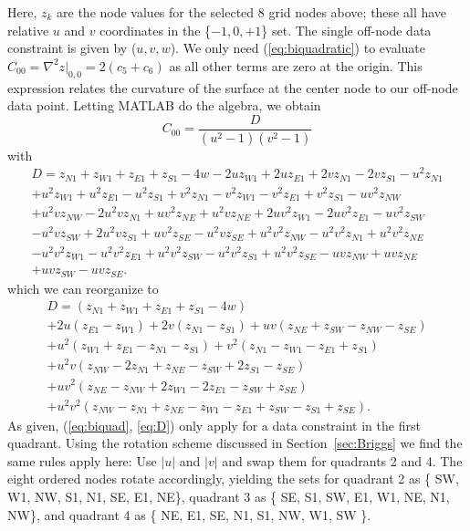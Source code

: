 \documentclass[12pt,letterpaper,margin=0.5in]{article}
\begin{document}
Here, $z_k$ are the node values for the selected 8 grid nodes above;
these all have relative $u$ and $v$ coordinates in the \{$-1, 0, +1$\} set.
The single off-node data constraint is given by ($u,v,w$).  We only need
(\ref{eq:biquadratic}) to evaluate $C_{00} = \nabla^2 z \rvert _{0, 0} = 2 \left(c_5 + c_6 \right)$
as all other terms are zero at the origin.  This expression relates the curvature of the
surface at the center node to our off-node data point.  Letting MATLAB do the algebra,
we obtain
\begin{equation}
C_{00} = \frac{D}{(u^2-1)(v^2-1)}
\label{eq:biquad}
\end{equation}
with
\begin{equation}
\begin{split}
D = z_{N1} + z_{W1} + z_{E1} + z_{S1} - 4w - 2u z_{W1} + 2 u z_{E1} + 2 v z_{N1} - 2 v z_{S1} - u^2 z_{N1}   \\
    + u^2 z_{W1} + u^2 z_{E1} - u^2 z_{S1} + v^2 z_{N1} - v^2 z_{W1} - v^2 z_{E1} + v^2 z_{S1} - u v^2 z_{NW}    \\
    + u^2 v z_{NW} - 2 u^2 v z_{N1} + u v^2 z_{NE} + u^2 v z_{NE} + 2 u v^2 z_{W1} - 2 u v^2 z_{E1} - u v^2 z_{SW}  \\
    - u^2 v z_{SW} + 2 u^2 v z_{S1} + u v^2 z_{SE} - u^2 v z_{SE} + u^2 v^2 z_{NW} - u^2 v^2 z_{N1} + u^2 v^2 z_{NE}   \\
    - u^2 v^2 z_{W1} - u^2 v^2 z_{E1}+ u^2 v^2 z_{SW} - u^2 v^2 z_{S1} + u^2 v^2 z_{SE} - u v z_{NW} + u v z_{NE} \\
    + u v z_{SW} - u v z_{SE}.
\end{split}
\end{equation}
which we can reorganize to
\begin{equation}
\begin{split}
D = (z_{N1} + z_{W1} + z_{E1} + z_{S1} - 4w)   \\
	+ 2u (z_{E1} - z_{W1}) + 2v (z_{N1} - z_{S1}) + u v (z_{NE} + z_{SW} - z_{NW} - z_{SE}) \\
	+ u^2 (z_{W1} + z_{E1} - z_{N1} - z_{S1}) + v^2 (z_{N1} - z_{W1} - z_{E1} + z_{S1})    \\
	+ u^2 v (z_{NW} - 2 z_{N1} + z_{NE} - z_{SW} + 2 z_{S1} - z_{SE}) \\
	+ u v^2 (z_{NE} - z_{NW} + 2 z_{W1} - 2 z_{E1} - z_{SW} + z_{SE})  \\
	+ u^2 v^2 (z_{NW} - z_{N1} + z_{NE} - z_{W1} - z_{E1} + z_{SW} - z_{S1} + z_{SE}).
\end{split}
\label{eq:D}
\end{equation}
As given, (\ref{eq:biquad}, \ref{eq:D}) only apply for a data constraint in the first quadrant.  Using the rotation scheme discussed
in Section~\ref{sec:Briggs} we find the same rules apply here: Use $|u|$ and $|v|$ and swap them for quadrants 2 and 4.
The eight ordered nodes rotate accordingly, yielding the sets for quadrant 2 as \{ SW, W1, NW, S1, N1, SE, E1, NE\},
quadrant 3 as \{ SE, S1, SW, E1, W1, NE, N1, NW\}, and quadrant 4 as \{ NE, E1, SE, N1, S1, NW, W1, SW \}.
\end{document}
